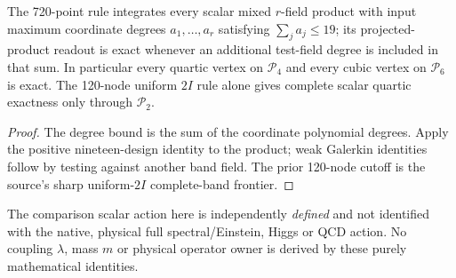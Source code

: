 \documentclass[12pt,a4paper]{article}
\begin{document}
\begin{corollary}
\label{p3b:cor:cc17-scalar-vertices}
The 720-point rule integrates every scalar mixed $r$-field product
with input maximum coordinate degrees $a_1,\ldots,a_r$ satisfying
$\sum_j a_j\le19$; its projected-product readout is exact whenever
an additional test-field degree is included in that sum.
In particular every quartic vertex on $\mathcal P_4$ and every
cubic vertex on $\mathcal P_6$ is exact. The 120-node uniform $2I$
rule alone gives complete scalar quartic exactness only through
$\mathcal P_2$.
\end{corollary}
\begin{proof}
The degree bound is the sum of the coordinate polynomial degrees.
Apply the positive nineteen-design identity to the product;
weak Galerkin identities follow by testing against another band field.
The prior 120-node cutoff is the source's sharp uniform-$2I$
complete-band frontier.
\end{proof}

\begin{remark}
The comparison scalar action here is independently \emph{defined} and
not identified with the native, physical full spectral/Einstein,
Higgs or QCD action. No coupling $\lambda$, mass $m$ or physical
operator owner is derived by these purely mathematical identities.
\end{remark}
\end{document}
